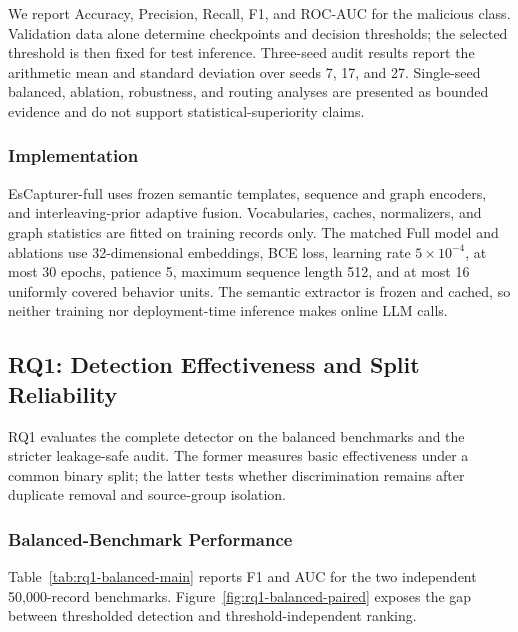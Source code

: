 We report Accuracy, Precision, Recall, F1, and ROC-AUC for the malicious
class.  Validation data alone determine checkpoints and decision thresholds;
the selected threshold is then fixed for test inference.  Three-seed audit
results report the arithmetic mean and standard deviation over seeds 7, 17,
and 27.  Single-seed balanced, ablation, robustness, and routing analyses are
presented as bounded evidence and do not support statistical-superiority
claims.

\subsubsection{Implementation}
EsCapturer-full uses frozen semantic templates, sequence and graph encoders,
and interleaving-prior adaptive fusion.  Vocabularies, caches, normalizers,
and graph statistics are fitted on training records only.  The matched Full
model and ablations use 32-dimensional embeddings, BCE loss, learning rate
$5{\times}10^{-4}$, at most 30 epochs, patience 5, maximum sequence length
512, and at most 16 uniformly covered behavior units.  The semantic extractor
is frozen and cached, so neither training nor deployment-time inference makes
online LLM calls.

\subsection{RQ1: Detection Effectiveness and Split Reliability}
\label{sec:rq1}

RQ1 evaluates the complete detector on the balanced benchmarks and the
stricter leakage-safe audit.  The former measures basic effectiveness under a
common binary split; the latter tests whether discrimination remains after
duplicate removal and source-group isolation.

\subsubsection{Balanced-Benchmark Performance}
Table~\ref{tab:rq1-balanced-main} reports F1 and AUC for the two independent
50,000-record benchmarks.  Figure~\ref{fig:rq1-balanced-paired} exposes the
gap between thresholded detection and threshold-independent ranking.

